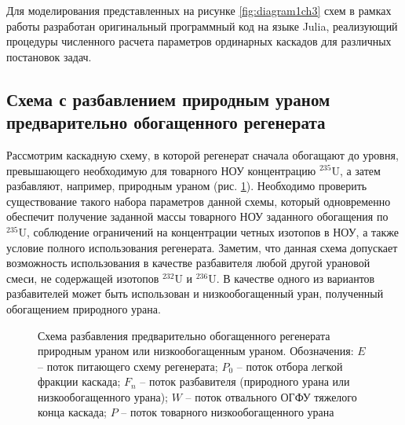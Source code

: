 Для моделирования представленных на рисунке \ref{fig:diagram1ch3} схем в рамках работы разработан оригинальный программный код на языке Julia, реализующий процедуры численного расчета параметров ординарных каскадов для различных постановок задач.

\subsection{Схема с разбавлением природным ураном предварительно обогащенного регенерата}

Рассмотрим каскадную схему, в которой регенерат сначала обогащают до уровня, превышающего необходимую для товарного НОУ концентрацию $^{235}$U, а затем разбавляют, например, природным ураном (рис. \ref{o1}). Необходимо проверить существование такого набора параметров данной схемы, который одновременно обеспечит получение заданной массы товарного НОУ заданного обогащения по $^{235}$U, соблюдение ограничений на концентрации четных изотопов в НОУ, а также условие полного использования регенерата. Заметим, что данная схема допускает возможность использования в качестве разбавителя любой другой урановой смеси, не содержащей изотопов $^{232}$U и $^{236}$U. В качестве одного из вариантов разбавителей может быть использован и низкообогащенный уран, полученный обогащением природного урана.

\begin{figure}[ht]
  \caption{Схема разбавления предварительно обогащенного регенерата природным ураном или низкообогащенным ураном. Обозначения: $E$ -- поток питающего схему регенерата; $P_0$ -- поток отбора легкой фракции каскада; $F_n$ -- поток разбавителя (природного урана или низкообогащенного урана); $W$ -- поток отвального ОГФУ тяжелого конца каскада; $P$ -- поток товарного низкообогащенного урана}\label{o1}
\end{figure}



